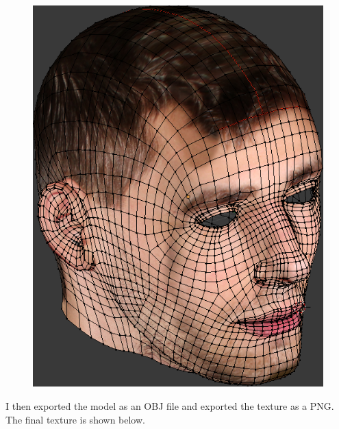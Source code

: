 \documentclass{article}
\begin{document}
\begin{figure}[H]
\begin{minipage}{.5\textwidth}
        \includegraphics[width=\linewidth]{model_textured.png}
    \end{minipage}
\end{figure}

\newpage
I then exported the model as an OBJ file and exported the
texture as a PNG. The final texture is shown below.
\end{document}
